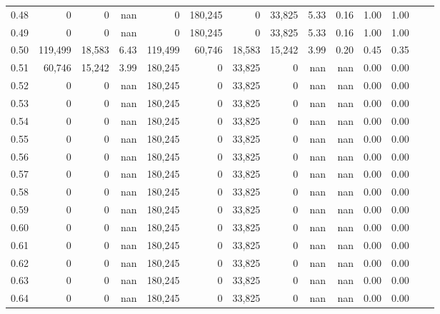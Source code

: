 \begin{tabular}{rrrrrrrrrrrrrr}
0.48 &        0 &       0 &     nan &        0 &  180,245 &       0 &  33,825 &  5.33 &  0.16 &  1.00 &      1.00 \\
0.49 &        0 &       0 &     nan &        0 &  180,245 &       0 &  33,825 &  5.33 &  0.16 &  1.00 &      1.00 \\
0.50 &  119,499 &  18,583 &    6.43 &  119,499 &   60,746 &  18,583 &  15,242 &  3.99 &  0.20 &  0.45 &      0.35 \\
0.51 &   60,746 &  15,242 &    3.99 &  180,245 &        0 &  33,825 &       0 &   nan &   nan &  0.00 &      0.00 \\
0.52 &        0 &       0 &     nan &  180,245 &        0 &  33,825 &       0 &   nan &   nan &  0.00 &      0.00 \\
0.53 &        0 &       0 &     nan &  180,245 &        0 &  33,825 &       0 &   nan &   nan &  0.00 &      0.00 \\
0.54 &        0 &       0 &     nan &  180,245 &        0 &  33,825 &       0 &   nan &   nan &  0.00 &      0.00 \\
0.55 &        0 &       0 &     nan &  180,245 &        0 &  33,825 &       0 &   nan &   nan &  0.00 &      0.00 \\
0.56 &        0 &       0 &     nan &  180,245 &        0 &  33,825 &       0 &   nan &   nan &  0.00 &      0.00 \\
0.57 &        0 &       0 &     nan &  180,245 &        0 &  33,825 &       0 &   nan &   nan &  0.00 &      0.00 \\
0.58 &        0 &       0 &     nan &  180,245 &        0 &  33,825 &       0 &   nan &   nan &  0.00 &      0.00 \\
0.59 &        0 &       0 &     nan &  180,245 &        0 &  33,825 &       0 &   nan &   nan &  0.00 &      0.00 \\
0.60 &        0 &       0 &     nan &  180,245 &        0 &  33,825 &       0 &   nan &   nan &  0.00 &      0.00 \\
0.61 &        0 &       0 &     nan &  180,245 &        0 &  33,825 &       0 &   nan &   nan &  0.00 &      0.00 \\
0.62 &        0 &       0 &     nan &  180,245 &        0 &  33,825 &       0 &   nan &   nan &  0.00 &      0.00 \\
0.63 &        0 &       0 &     nan &  180,245 &        0 &  33,825 &       0 &   nan &   nan &  0.00 &      0.00 \\
0.64 &        0 &       0 &     nan &  180,245 &        0 &  33,825 &       0 &   nan &   nan &  0.00 &      0.00 \\

\end{tabular}
